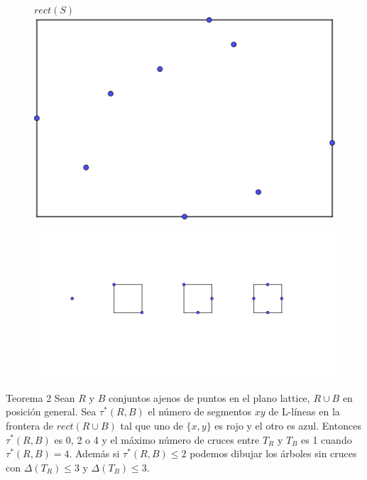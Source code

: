 \documentclass{beamer}
\begin{document}
\begin{frame}
\begin{figure}[h]
$rect(S)$
\includegraphics[width=\textwidth]{Ejemplo-rect-S}
\end{figure}
\end{frame}
\begin{frame}
\begin{figure}[h]
\includegraphics[width=\textwidth]{Cantidad-en-rect-S}
\end{figure}
\end{frame}
\begin{frame}
\begin{block}{Teorema 2}
Sean $R$ y $B$ conjuntos ajenos de puntos en el plano lattice, $R \cup B$ en posición general. Sea $\tau^*(R, B)$  el número de segmentos  $xy$ de L-líneas en la frontera de $rect(R\cup B)$  tal que uno de $\{ x,y\}$ es rojo y el otro es azul. Entonces $\tau^*(R, B)$  es 0, 2 o 4 y el máximo número de cruces entre $T_R$ y $T_B$ es 1 cuando $\tau^*(R, B) = 4$. Además si $\tau^*(R, B) \leq 2$ podemos dibujar los árboles sin cruces con $\Delta(T_R) \leq 3$ y $\Delta(T_B) \leq 3$. \cite{Kano2013}
\end{block}
\end{frame}
\end{document}
